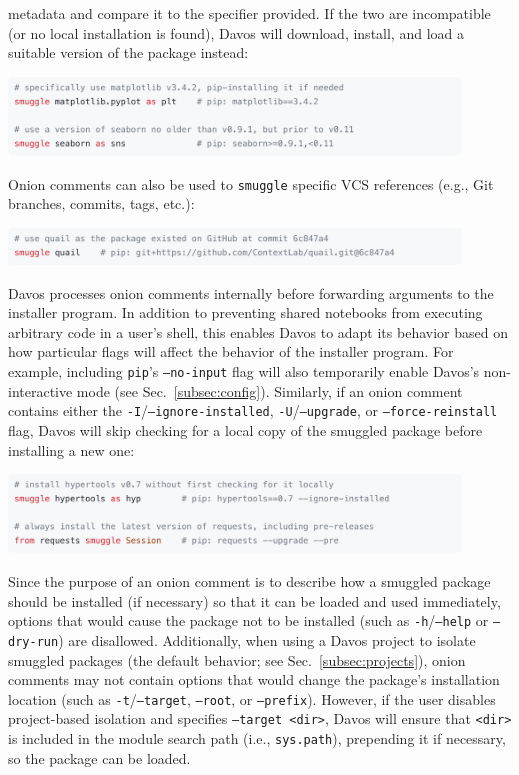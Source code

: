 \documentclass[preprint,12pt,a4paper]{elsarticle}
\begin{document}
metadata and compare it to the specifier provided. If the two are incompatible
(or no local installation is found), Davos will download, install, and load a
suitable version of the package instead:
\begin{center}
  \includegraphics[width=0.9\textwidth]{figs/snippet3}
\end{center}
Onion comments can also be used to \texttt{smuggle} specific VCS references (e.g.,
Git~\cite{TorvHama05} branches, commits, tags, etc.):
\begin{center}
  \includegraphics[width=0.9\textwidth]{figs/snippet4}
\end{center}
Davos processes onion comments internally before forwarding arguments to the
installer program. In addition to preventing shared notebooks from executing
arbitrary code in a user's shell, this enables Davos to adapt its behavior
based on how particular flags will affect the behavior of the installer
program. For example, including \texttt{pip}'s \texttt{--no-input} flag will also
temporarily enable Davos's non-interactive mode (see Sec.~\ref{subsec:config}).
Similarly, if an onion comment contains either the \texttt{-I}/\texttt{--ignore-installed},
\texttt{-U}/\texttt{--upgrade}, or \texttt{--force-reinstall} flag, Davos will
skip checking for a local copy of the smuggled package before installing a
new one:
\begin{center}
  \includegraphics[width=0.9\textwidth]{figs/snippet5}
\end{center}
Since the purpose of an onion comment is to describe how a smuggled package
should be installed (if necessary) so that it can be loaded and used
immediately, options that would cause the package not to be installed (such as
\texttt{-h}/\texttt{--help} or \texttt{--dry-run}) are disallowed. Additionally,
when using a Davos project to isolate smuggled packages (the default behavior;
see Sec.~\ref{subsec:projects}), onion comments may not contain options that
would change the package's installation location (such as
\texttt{-t}/\texttt{--target}, \texttt{--root}, or \texttt{--prefix}). However, if
the user disables project-based isolation and specifies \texttt{--target <dir>},
Davos will ensure that \texttt{<dir>} is included in the module search path (i.e.,
\texttt{sys.path}), prepending it if necessary, so the package can be loaded.
\end{document}
